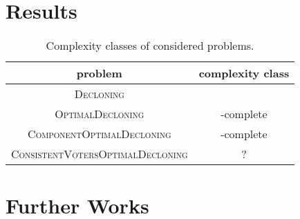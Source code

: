 \section{Results}


\begin{table}
\begin{center}
\begin{tabular}{| c | c |}\hline
	\textbf{problem} & \textbf{complexity class} \\ \hline
	\textsc{Decloning} & \p \\ \hline
	\textsc{OptimalDecloning} & \np-complete \\ \hline
	\textsc{ComponentOptimalDecloning} & \np-complete \\ \hline
	\textsc{ConsistentVotersOptimalDecloning} & ? \\ \hline
\end{tabular}
\caption{Complexity classes of considered problems.}
\end{center}
\end{table}


\section{Further Works}

